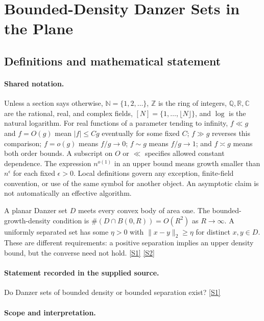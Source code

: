 \documentclass[11pt,a4paper]{article}
\newcommand{\N}{\mathbb{N}}
\newcommand{\Z}{\mathbb{Z}}
\newcommand{\Q}{\mathbb{Q}}
\newcommand{\R}{\mathbb{R}}
\newcommand{\C}{\mathbb{C}}
\newcommand{\sref}[2]{\hyperlink{source:#1:#2}{[S#2]}}
\begin{document}
\section{Bounded-Density Danzer Sets in the Plane}\label{statement}


\subsection{Definitions and mathematical statement}

\paragraph{Shared notation.}Unless a section says otherwise, $\N=\{1,2,\ldots\}$,
$\Z$ is the ring of integers, $\Q,\R,\C$ are the rational, real, and complex
fields, $[N]=\{1,\ldots,\lfloor N\rfloor\}$, and $\log$ is the natural
logarithm. For real functions of a parameter tending to infinity,
$f\ll g$ and $f=O(g)$ mean $|f|\leq Cg$ eventually for some fixed $C$;
$f\gg g$ reverses this comparison; $f=o(g)$ means $f/g\to0$;
$f\sim g$ means $f/g\to1$; and $f\asymp g$ means both order bounds.
A subscript on $O$ or $\ll$ specifies allowed constant dependence.
The expression $n^{o(1)}$ in an upper bound means growth smaller than
$n^\epsilon$ for each fixed $\epsilon>0$. Local definitions govern any
exception, finite-field convention, or use of the same symbol for another
object. An asymptotic claim is not automatically an effective algorithm.



A planar Danzer set $D$ meets every convex body of area one. The bounded-growth-density condition is $\#(D\cap B(0,R))=O(R^2)$ as $R\to\infty$. A uniformly separated set has some $\eta>0$ with $\|x-y\|_2\geq\eta$ for distinct $x,y\in D$. These are different requirements: a positive separation implies an upper density bound, but the converse need not hold. \sref{statement}{1} \sref{statement}{2}

\paragraph{Statement recorded in the supplied source.}
Do Danzer sets of bounded density or bounded separation exist? \sref{statement}{1}

\paragraph{Scope and interpretation.}
\end{document}
